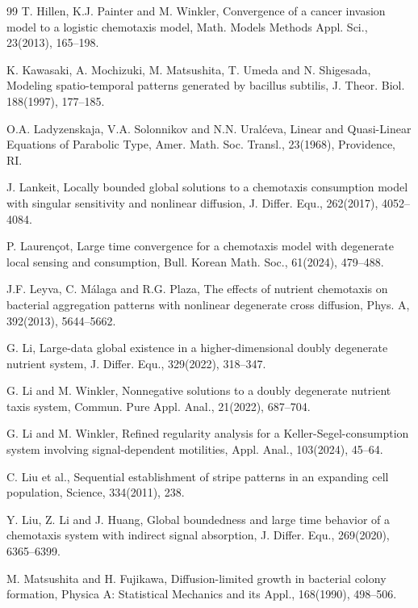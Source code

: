 \documentclass[12pt]{article}
\theoremstyle{plain}
\theoremstyle{definition}
\numberwithin{equation}{section}
\begin{document}
\begin{thebibliography}{99}
T. Hillen, K.J. Painter and M. Winkler, Convergence of a cancer invasion model to a logistic chemotaxis model, Math. Models Methods Appl. Sci., 23(2013), 165--198.


K. Kawasaki, A. Mochizuki, M. Matsushita, T. Umeda and N. Shigesada, Modeling spatio-temporal patterns generated by bacillus subtilis, J. Theor. Biol. 188(1997), 177--185.

O.A. Ladyzenskaja, V.A. Solonnikov and N.N. Ural\'ceva, Linear and Quasi-Linear Equations of Parabolic Type, Amer. Math. Soc. Transl., 23(1968), Providence, RI.

J. Lankeit, Locally bounded global solutions to a chemotaxis consumption model with singular sensitivity
and nonlinear diffusion, J. Differ. Equ., 262(2017), 4052--4084.

P. Lauren\c{c}ot, Large time convergence for a chemotaxis model with degenerate local sensing and consumption,  Bull. Korean Math. Soc.,  61(2024), 479--488.


J.F. Leyva, C. M\'{a}laga and R.G. Plaza, The effects of nutrient chemotaxis on bacterial aggregation patterns with nonlinear degenerate cross diffusion, Phys. A, 392(2013), 5644--5662.


G. Li, Large-data global existence in a higher-dimensional doubly degenerate nutrient system, J. Differ. Equ., 329(2022), 318--347.


G. Li and M. Winkler, Nonnegative solutions to a doubly degenerate nutrient taxis system, Commun. Pure Appl. Anal., 21(2022), 687--704.

G. Li and M. Winkler, Refined regularity analysis for a Keller-Segel-consumption system involving signal-dependent motilities, Appl. Anal., 103(2024), 45--64.



C. Liu et al., Sequential establishment of stripe patterns in an expanding cell population, Science, 334(2011), 238.


Y. Liu, Z. Li and J. Huang, Global boundedness and large time behavior of a chemotaxis system with indirect signal absorption, J. Differ. Equ., 269(2020), 6365--6399.


M. Matsushita and H. Fujikawa, Diffusion-limited growth in bacterial colony formation, Physica A: Statistical Mechanics and its Appl., 168(1990), 498--506.


\end{thebibliography}
\end{document}
